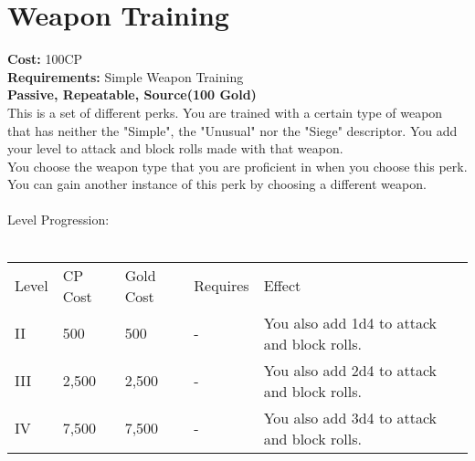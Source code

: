 \section{Weapon Training}\label{perk:weaponTraining}
\textbf{Cost:} 100CP\\
\textbf{Requirements:} Simple Weapon Training\\
\textbf{Passive, Repeatable, Source(100 Gold)}\\
This is a set of different perks.
You are trained with a certain type of weapon that has neither the "Simple", the "Unusual" nor the "Siege" descriptor.
You add your level to attack and block rolls made with that weapon.\\
You choose the weapon type that you are proficient in when you choose this perk.
You can gain another instance of this perk by choosing a different weapon.\\
\\
Level Progression:\\
\\
\begin{tabular}{l | l | l | l | l}
	Level & CP Cost & Gold Cost & Requires & Effect\\
	II & 500 & 500 & - & You also add 1d4 to attack and block rolls.\\
	III & 2,500 & 2,500 & - & You also add 2d4 to attack and block rolls.\\
	IV & 7,500 & 7,500 & - & You also add 3d4 to attack and block rolls.\\
\end{tabular}